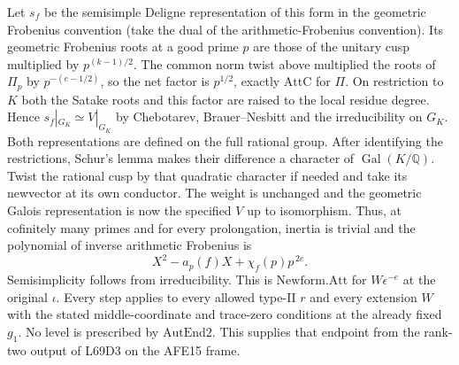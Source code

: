 Let $s_f$ be the semisimple Deligne representation of this form
in the geometric Frobenius convention (take the dual of the
arithmetic-Frobenius convention). Its geometric Frobenius roots
at a good prime $p$ are those of the unitary cusp multiplied
by $p^{(k-1)/2}$. The common norm twist above multiplied
the roots of $\Pi_p$ by $p^{-(e-1/2)}$, so the net factor is
$p^{1/2}$, exactly $\mathrm{AttC}$ for $\Pi$. On restriction
to $K$ both the Satake roots and this factor are raised to
the local residue degree. Hence $s_f|_{G_K}\simeq V|_{G_K}$
by Chebotarev, Brauer--Nesbitt and the irreducibility on $G_K$.
Both representations are defined on the full rational group.
After identifying the restrictions, Schur's lemma makes their
difference a character of $\operatorname{Gal}(K/\mathbb Q)$.
Twist the rational cusp by that quadratic character if needed
and take its newvector at its own conductor. The weight is
unchanged and the geometric Galois representation is now the
specified $V$ up to isomorphism. Thus, at cofinitely many primes
and for every prolongation, inertia is trivial and the polynomial
of inverse arithmetic Frobenius is
\[
 X^2-a_p(f)X+\chi_f(p)p^{\,2e}.
\]
Semisimplicity follows from irreducibility. This is
$\mathrm{Newform.Att}$ for $W\epsilon^{-e}$ at the original
$\iota$. Every step applies to every allowed type-II $r$ and
every extension $W$ with the stated middle-coordinate and
trace-zero conditions at the already fixed $g_1$. No level
is prescribed by $\mathrm{AutEnd2}$. This supplies that endpoint
from the rank-two output of L69D3 on the AFE15 frame.
